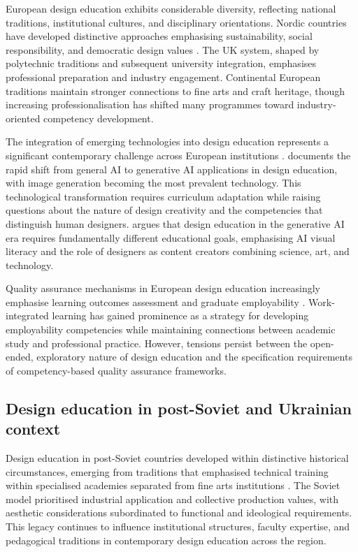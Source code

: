 \documentclass[ed]{acnsart}
\begin{document}
	European design education exhibits considerable diversity, reflecting national traditions, institutional cultures, and disciplinary orientations. Nordic countries have developed distinctive approaches emphasising sustainability, social responsibility, and democratic design values \cite{Maia2022105}. The UK system, shaped by polytechnic traditions and subsequent university integration, emphasises professional preparation and industry engagement. Continental European traditions maintain stronger connections to fine arts and craft heritage, though increasing professionalisation has shifted many programmes toward industry-oriented competency development.
	
	The integration of emerging technologies into design education represents a significant contemporary challenge across European institutions \cite{Chen2025}. \citet{Song2025401} documents the rapid shift from general AI to generative AI applications in design education, with image generation becoming the most prevalent technology. This technological transformation requires curriculum adaptation while raising questions about the nature of design creativity and the competencies that distinguish human designers. \citet{Hwang2025239} argues that design education in the generative AI era requires fundamentally different educational goals, emphasising AI visual literacy and the role of designers as content creators combining science, art, and technology.
	
	Quality assurance mechanisms in European design education increasingly emphasise learning outcomes assessment and graduate employability \cite{Srivastava2024305}. Work-integrated learning has gained prominence as a strategy for developing employability competencies while maintaining connections between academic study and professional practice. However, tensions persist between the open-ended, exploratory nature of design education and the specification requirements of competency-based quality assurance frameworks.
	
	\subsection{Design education in post-Soviet and Ukrainian context}
	
	Design education in post-Soviet countries developed within distinctive historical circumstances, emerging from traditions that emphasised technical training within specialised academies separated from fine arts institutions \cite{Fursa2014}. The Soviet model prioritised industrial application and collective production values, with aesthetic considerations subordinated to functional and ideological requirements. This legacy continues to influence institutional structures, faculty expertise, and pedagogical traditions in contemporary design education across the region.
	
\end{document}
